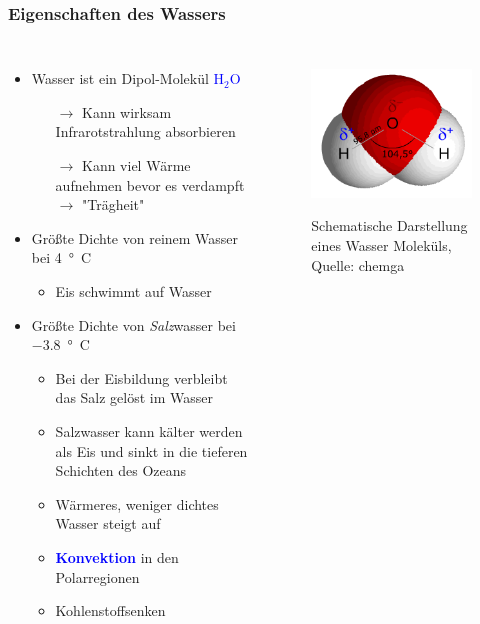 \begin{frame}
	\frametitle{Eigenschaften des Wassers} %
	\begin{columns}
		\begin{itemize}
			\item Wasser ist ein Dipol-Molekül \textcolor{blue}{H$_2$O}
			\begin{itemize}
				\item[$\rightarrow$] Kann wirksam Infrarotstrahlung absorbieren
				\item[$\rightarrow$] Kann viel Wärme aufnehmen bevor es verdampft $\rightarrow$ "Trägheit"
			\end{itemize}
			\item<2-> Größte Dichte von reinem Wasser bei \SI{4}{°C}
			\begin{itemize}
				\item<2->[$\rightarrow$] Eis schwimmt auf Wasser
			\end{itemize}
			\item<3->Größte Dichte von \textit{Salz}wasser bei \SI{-3,8}{°C}
			\begin{itemize}
				\item<3-> [] Bei der Eisbildung verbleibt das Salz gelöst im Wasser
				\item<3-> [$\rightarrow$] Salzwasser kann kälter werden als Eis und sinkt in die tieferen Schichten des Ozeans
				\item<3-> [$\rightarrow$] Wärmeres, weniger dichtes Wasser steigt auf
				\item<3-> [] \textbf{\textcolor{blue}{Konvektion}} in den Polarregionen
				\item<3-> [$\rightarrow$] Kohlenstoffsenken
			\end{itemize}
		\end{itemize}
		\begin{figure}
			\includegraphics[scale=0.7]{bilder/wasser_molekuel}\\		\caption{Schematische Darstellung eines Wasser Moleküls, Quelle: chemga}

\end{figure}
\end{columns}
\end{frame}
